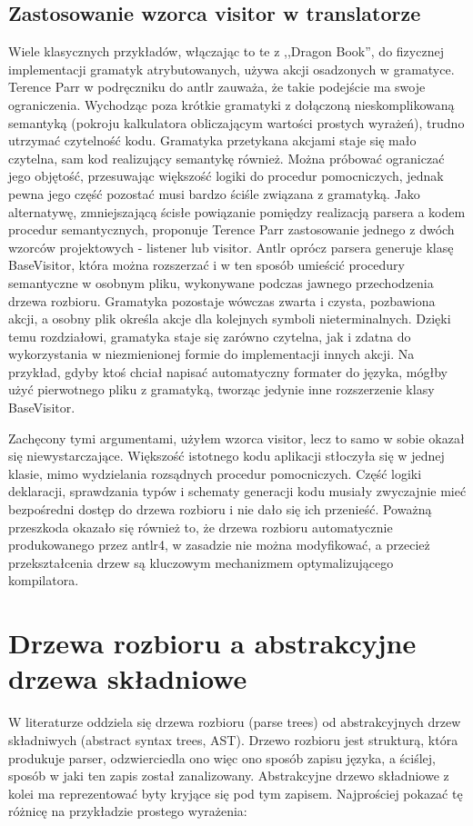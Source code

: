\subsection{Zastosowanie wzorca visitor w translatorze}
Wiele klasycznych przykładów, włączając to te z ,,Dragon Book''\cite{DRAGON_BOOK}, do fizycznej implementacji gramatyk atrybutowanych, używa akcji osadzonych w gramatyce. Terence Parr w podręczniku do antlr\cite{Definitive_antlr_reference} zauważa, że takie podejście ma swoje ograniczenia. Wychodząc poza krótkie gramatyki z dołączoną nieskomplikowaną semantyką (pokroju kalkulatora obliczającym wartości prostych wyrażeń), trudno utrzymać czytelność kodu. Gramatyka przetykana akcjami staje się mało czytelna, sam kod realizujący semantykę również. Można próbować ograniczać jego objętość, przesuwając większość logiki do procedur pomocniczych, jednak pewna jego część pozostać musi bardzo ściśle związana z gramatyką. Jako alternatywę, zmniejszającą ścisłe powiązanie pomiędzy realizacją parsera a kodem procedur semantycznych, proponuje Terence Parr zastosowanie jednego z dwóch wzorców projektowych - listener lub visitor. Antlr oprócz parsera generuje klasę BaseVisitor, która można rozszerzać i w ten sposób umieścić procedury semantyczne w osobnym pliku, wykonywane podczas jawnego przechodzenia drzewa rozbioru. Gramatyka pozostaje wówczas zwarta i czysta, pozbawiona akcji, a osobny plik określa akcje dla kolejnych symboli nieterminalnych. Dzięki temu rozdziałowi, gramatyka staje się zarówno czytelna, jak i zdatna do wykorzystania w niezmienionej formie do implementacji innych akcji. Na przykład, gdyby ktoś chciał napisać automatyczny formater do języka, mógłby użyć pierwotnego pliku z gramatyką, tworząc jedynie inne rozszerzenie klasy BaseVisitor.

Zachęcony tymi argumentami, użyłem wzorca visitor, lecz to samo w sobie okazał się niewystarczające. Większość istotnego kodu aplikacji stłoczyła się w jednej klasie, mimo wydzielania rozsądnych procedur pomocniczych. Część logiki deklaracji, sprawdzania typów i schematy generacji kodu musiały zwyczajnie mieć bezpośredni dostęp do drzewa rozbioru i nie dało się ich przenieść. Poważną przeszkoda okazało się również to, że drzewa rozbioru automatycznie produkowanego przez antlr4, w zasadzie nie można modyfikować, a przecież przekształcenia drzew są kluczowym mechanizmem optymalizującego kompilatora.

\section{Drzewa rozbioru a abstrakcyjne drzewa składniowe}
W literaturze oddziela się drzewa rozbioru (parse trees) od abstrakcyjnych drzew składniwych (abstract syntax trees, AST).\cite{DRAGON_BOOK} Drzewo rozbioru jest strukturą, która produkuje parser, odzwierciedla ono więc ono sposób zapisu języka, a ściślej, sposób w jaki ten zapis został zanalizowany. Abstrakcyjne drzewo składniowe z kolei ma reprezentować byty kryjące się pod tym zapisem. Najprościej pokazać tę różnicę na przykładzie prostego wyrażenia:

